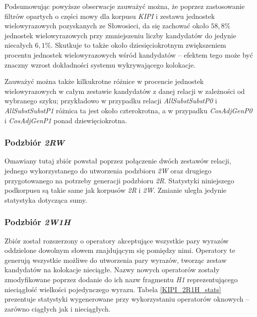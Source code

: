 \par
Podsumowując powyższe obserwacje zauważyć można, że poprzez zastosowanie filtrów opartych o części mowy dla korpusu \emph{KIPI} i zestawu jednostek wielowyrazowych pozyskanych ze Słowosieci, da się zachować około $ 58,8\% $ jednostek wielowyrazowych przy zmniejszeniu liczby kandydatów do jedynie niecałych $ 6,1\% $.
Skutkuje to także około dziesięciokrotnym zwiększeniem procentu jednostek wielowyrazowych wśród kandydatów -- efektem tego może być znaczny wzrost dokładności systemu wykrywającego kolokacje.

\par
Zauważyć można także kilkukrotne różnice w procencie jednostek wielowyrazowych w całym zestawie kandydatów z danej relacji w zależności od wybranego szyku; przykładowo w przypadku relacji \emph{AllSubstSubstP0} i \emph{AllSubstSubstP1} różnica ta jest około czterokrotna, a w przypadku \emph{CosAdjGenP0} i \emph{CosAdjGenP1} ponad dziewięciokrotna.


\subsubsection{Podzbiór \protect\textit{2RW}}
Omawiany tutaj zbiór powstał poprzez połączenie dwóch zestawów relacji, jednego wykorzystanego do utworzenia podzbioru \emph{2W} oraz drugiego przygotowanego na potrzeby generacji podzbioru \emph{2R}.
Statystyki niniejszego podkorpusu są takie same jak korpusów \emph{2R} i \emph{2W}.
Zmianie uległa jedynie statystyka dotycząca sumy.


\subsubsection{Podzbiór \protect\textit{2W1H}}
Zbiór został rozszerzony o operatory akceptujące wszystkie pary wyrazów oddzielone dowolnym słowem znajdującym się pomiędzy nimi.
Operatory te generują wszystkie możliwe do utworzenia pary wyrazów, tworząc zestaw kandydatów na kolokacje nieciągłe.
Nazwy nowych operatorów zostały zmodyfikowane poprzez dodanie do ich nazw fragmentu \emph{H1} reprezentującego nieciągłość wielkości pojedynczego wyrazu.
Tabela \ref{KIPI_2R1H_stats} prezentuje statystyki wygenerowane przy wykorzystaniu operatorów oknowych -- zarówno ciągłych jak i nieciągłych.


